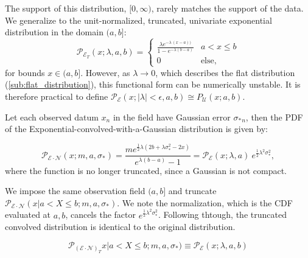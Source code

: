 \documentclass[twocolumn]{aastex631}
\newcommand{\mcal}[1]{\mathcal{#1}}
\newcommand{\Exp}[1]{e^{#1}}
\newcommand{\pdf}{\mcal{P}}
\newcommand{\sigobs}{{\sigma_*}}
\begin{document}
        The support of this distribution, $[0, \infty)$, rarely matches the
        support of the data. We generalize to the unit-normalized, truncated,
        univariate exponential distribution in the domain $(a, b]$:
        \begin{equation} \label{eq:pdf_truncexp_univariate}
            \pdf_{\mcal{E}_T}(x; \lambda, a, b) = \begin{cases}
                \frac{\lambda \Exp{-\lambda \, (x - a))}}{1 - \Exp{-\lambda(b - a)}} & a < x \leq b \\
                0 & \text{else},
            \end{cases}
        \end{equation}
        for bounds $x \in (a,b]$. However, as $\lambda \rightarrow 0$, which
        describes the flat distribution (\autoref{sub:flat_distribution}), this
        functional form can be numerically unstable. It is therefore practical
        to define $\pdf_{\mcal{E}}(x; |\lambda| < \epsilon, a, b) \cong
        P_{\mcal{U}}(x; a,b)$.

        Let each observed datum $x_n$ in the field have Gaussian error
        $\sigobs_n$, then the PDF of the Exponential-convolved-with-a-Gaussian
        distribution is given by:

        \begin{equation}
            \pdf_{\mcal{E}\cdot\mcal{N}}(x;m,a,\sigma_*) = \frac{m  e^{\frac{1}{2} \lambda  \left(2 b+\lambda  \sigma _*^2-2 x\right)}}{e^{\lambda  (b-a)}-1} = \pdf_{\mcal{E}}(x;\lambda,a) \ \Exp{\frac{1}{2}\lambda^2 \sigma_*^2},
        \end{equation}
        where the function is no longer truncated, since a Gaussian is not
        compact.

        We impose the same observation field $(a, b]$ and truncate
        $\pdf_{\mcal{E}\cdot\mcal{N}}(x | a < X \leq b;m,a,\sigma_*)$.  We note
        the normalization, which is the CDF evaluated at $a, b$, cancels the
        factor $\Exp{\frac{1}{2}\lambda^2 \sigma_*^2}$. Following thtough, the
        truncated convolved distribution is identical to the original
        distribution.

        \begin{equation}
            \pdf_{(\mcal{E}\cdot\mcal{N})_T}x | a < X \leq b;m,a,\sigma_*) \equiv \pdf_{\mcal{E}}(x; \lambda, a, b)
        \end{equation}

    \vspace{10pt}
\end{document}
